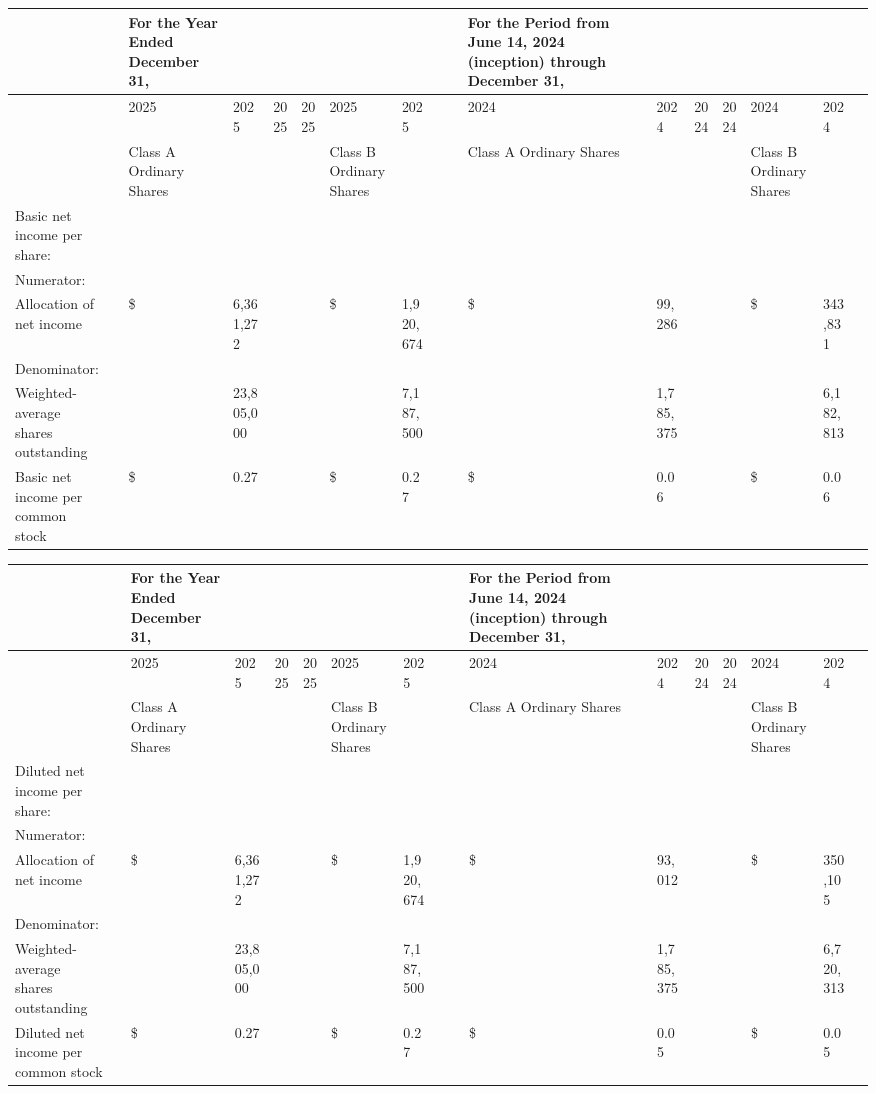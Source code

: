\documentclass[11pt,a4paper]{article}
\begin{document}
\begin{table}[h]
\begin{tabular}{|l|l|l|l|l|l|l|l|l|l|l|l|l|l|l|l|l|}
\hline
 &  & For the Year Ended December 31, &  &  &  &  &  &  &  & For the Period from June 14, 2024 (inception) through December 31, &  &  &  &  &  &  \\ \hline
 &  & 2025 & 2025 & 2025 & 2025 & 2025 & 2025 &  &  & 2024 & 2024 & 2024 & 2024 & 2024 & 2024 &  \\ \hline
 &  & Class A Ordinary Shares &  &  &  & Class B Ordinary Shares &  &  &  & Class A Ordinary Shares &  &  &  & Class B Ordinary Shares &  &  \\ \hline
Basic net income per share: &  &  &  &  &  &  &  &  &  &  &  &  &  &  &  &  \\ \hline
Numerator: &  &  &  &  &  &  &  &  &  &  &  &  &  &  &  &  \\ \hline
Allocation of net income &  & \$ & 6,361,272 &  &  & \$ & 1,920,674 &  &  & \$ & 99,286 &  &  & \$ & 343,831 &  \\ \hline
Denominator: &  &  &  &  &  &  &  &  &  &  &  &  &  &  &  &  \\ \hline
Weighted-average shares outstanding &  &  & 23,805,000 &  &  &  & 7,187,500 &  &  &  & 1,785,375 &  &  &  & 6,182,813 &  \\ \hline
Basic net income per common stock &  & \$ & 0.27 &  &  & \$ & 0.27 &  &  & \$ & 0.06 &  &  & \$ & 0.06 &  \\ \hline
\end{tabular}
\end{table}

\begin{table}[h]
\begin{tabular}{|l|l|l|l|l|l|l|l|l|l|l|l|l|l|l|l|l|}
\hline
 &  & For the Year Ended December 31, &  &  &  &  &  &  &  & For the Period from June 14, 2024 (inception) through December 31, &  &  &  &  &  &  \\ \hline
 &  & 2025 & 2025 & 2025 & 2025 & 2025 & 2025 &  &  & 2024 & 2024 & 2024 & 2024 & 2024 & 2024 &  \\ \hline
 &  & Class A Ordinary Shares &  &  &  & Class B Ordinary Shares &  &  &  & Class A Ordinary Shares &  &  &  & Class B Ordinary Shares &  &  \\ \hline
Diluted net income per share: &  &  &  &  &  &  &  &  &  &  &  &  &  &  &  &  \\ \hline
Numerator: &  &  &  &  &  &  &  &  &  &  &  &  &  &  &  &  \\ \hline
Allocation of net income &  & \$ & 6,361,272 &  &  & \$ & 1,920,674 &  &  & \$ & 93,012 &  &  & \$ & 350,105 &  \\ \hline
Denominator: &  &  &  &  &  &  &  &  &  &  &  &  &  &  &  &  \\ \hline
Weighted-average shares outstanding &  &  & 23,805,000 &  &  &  & 7,187,500 &  &  &  & 1,785,375 &  &  &  & 6,720,313 &  \\ \hline
Diluted net income per common stock &  & \$ & 0.27 &  &  & \$ & 0.27 &  &  & \$ & 0.05 &  &  & \$ & 0.05 &  \\ \hline
\end{tabular}
\end{table}
\end{document}
